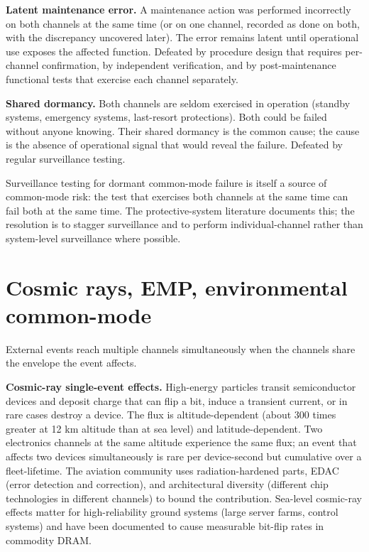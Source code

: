\textbf{Latent maintenance error.} A maintenance action was performed incorrectly on both channels at the same time (or on one channel, recorded as done on both, with the discrepancy uncovered later). The error remains latent until operational use exposes the affected function. Defeated by procedure design that requires per-channel confirmation, by independent verification, and by post-maintenance functional tests that exercise each channel separately.

\textbf{Shared dormancy.} Both channels are seldom exercised in operation (standby systems, emergency systems, last-resort protections). Both could be failed without anyone knowing. Their shared dormancy is the common cause; the cause is the absence of operational signal that would reveal the failure. Defeated by regular surveillance testing.

Surveillance testing for dormant common-mode failure is itself a source of common-mode risk: the test that exercises both channels at the same time can fail both at the same time. The protective-system literature documents this; the resolution is to stagger surveillance and to perform individual-channel rather than system-level surveillance where possible.

\section{Cosmic rays, EMP, environmental common-mode}

External events reach multiple channels simultaneously when the channels share the envelope the event affects.

\textbf{Cosmic-ray single-event effects.} High-energy particles transit semiconductor devices and deposit charge that can flip a bit, induce a transient current, or in rare cases destroy a device. The flux is altitude-dependent (about 300 times greater at 12 km altitude than at sea level) and latitude-dependent. Two electronics channels at the same altitude experience the same flux; an event that affects two devices simultaneously is rare per device-second but cumulative over a fleet-lifetime. The aviation community uses radiation-hardened parts, EDAC (error detection and correction), and architectural diversity (different chip technologies in different channels) to bound the contribution. Sea-level cosmic-ray effects matter for high-reliability ground systems (large server farms, control systems) and have been documented to cause measurable bit-flip rates in commodity DRAM.

